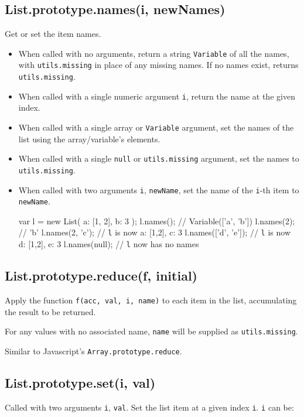 \documentclass{article}
\begin{document}
    \subsection{List.prototype.names(i, newNames)}
    Get or set the item names.


\begin{itemize}

\item When called with no arguments, return a string \texttt{Variable} of all the names,
with \texttt{utils.missing} in place of any missing names. If no names exist,
returns \texttt{utils.missing}.

\item When called with a single numeric argument \texttt{i}, return the name at the
given index.

\item When called with a single array or \texttt{Variable} argument, set the names of the
list using the array/variable's elements.

\item When called with a single \texttt{null} or \texttt{utils.missing} argument, set the names
to \texttt{utils.missing}.

\item When called with two arguments \texttt{i}, \texttt{newName}, set the name of the \texttt{i}-th item
to \texttt{newName}.


  var l = new List({ a: [1, 2], b: 3 });
  l.names();           // Variable(['a', 'b'])
  l.names(2);          // 'b'
  l.names(2, 'c');     // \texttt{l} is now { a: [1,2], c: 3 }
  l.names(['d', 'e']); // \texttt{l} is now { d: [1,2], e: 3 }
  l.names(null);       // \texttt{l} now has no names




\end{itemize}

    \subsection{List.prototype.reduce(f, initial)}
    Apply the function \texttt{f(acc, val, i, name)} to each item in the list,
accumulating the result to be returned.


For any values with no associated name, \texttt{name} will be supplied as
\texttt{utils.missing}.


Similar to Javascript's \texttt{Array.prototype.reduce}.


    \subsection{List.prototype.set(i, val)}
    Called with two arguments \texttt{i}, \texttt{val}. Set the list item at a given index \texttt{i}.
\texttt{i} can be:
\end{document}
